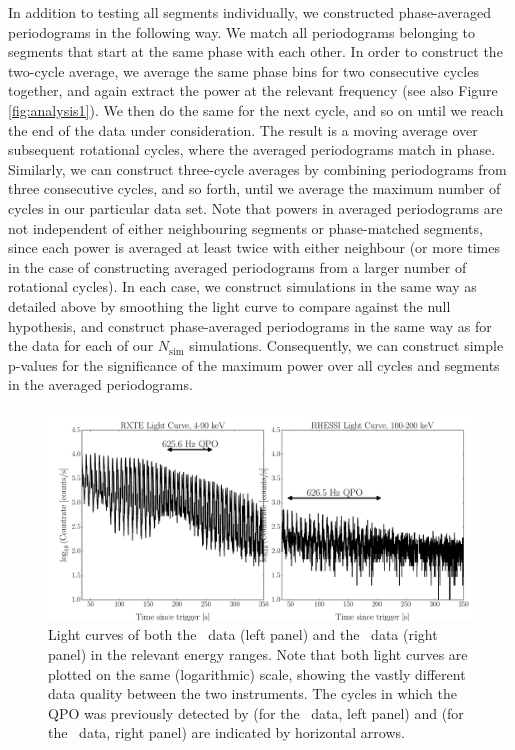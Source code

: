 \documentclass{emulateapj}
\begin{document}
In addition to testing all segments individually, we constructed phase-averaged periodograms in the following way. We match all periodograms belonging to segments that start at the same phase with each other. In order to construct the two-cycle average, we average the same phase bins for two consecutive cycles together, and again extract the power at the relevant frequency (see also Figure \ref{fig:analysis1}). We then do the same for the next cycle, and so on until we reach the end of the data under consideration. The result is a moving average over subsequent rotational cycles, where the averaged periodograms match in phase.
Similarly, we can construct three-cycle averages by combining periodograms from three consecutive cycles, and so forth, until we average the maximum number of cycles in our particular data set.  
Note that powers in averaged periodograms are not independent of either neighbouring segments or phase-matched segments, since each power is averaged at least twice with either neighbour (or more times in the case of constructing averaged periodograms from a larger number of rotational cycles). 
In each case, we construct simulations in the same way as detailed above by smoothing the light curve to compare against the null hypothesis, and construct phase-averaged periodograms in the same way as for the data for each of our $N_\mathrm{sim}$ simulations. Consequently, we can construct simple p-values for the significance of the maximum power over all cycles and segments in the averaged periodograms. 

\begin{figure}[htbp]
\begin{center}
\includegraphics[width=18cm]{f4.pdf}
\caption{Light curves of both the \rxte\ data (left panel) and the \rhessi\ data (right panel) in the relevant energy ranges. Note that both light curves are plotted on the same (logarithmic) scale, showing the vastly different data quality between the two instruments. 
The cycles in which the QPO was previously detected by \citet{Strohmayer06} (for the \rxte\ data, left panel) and \citet{Watts06} (for the \rhessi\ data, right panel) are indicated by horizontal arrows.}
\label{fig:lcs}
\end{center}
\end{figure}
\end{document}

